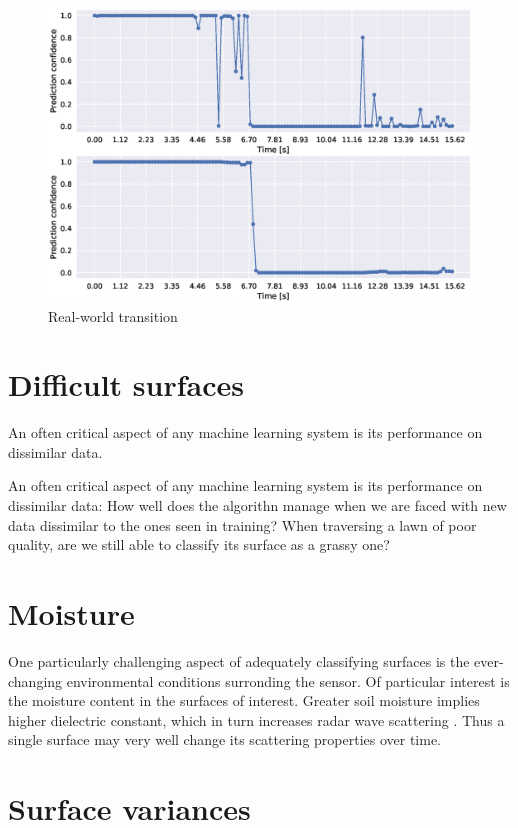 \begin{figure}
	\centering
	\includegraphics[scale=0.5]{figs_temp/transition_grass_gravel2}
	\caption{Real-world transition}
\end{figure}

\section{Difficult surfaces}
An often critical aspect of any machine learning system is its performance on dissimilar data. 

An often critical aspect of any machine learning system is its performance on dissimilar data: How well does the algorithn manage when we are faced with new data dissimilar to the ones seen in training? When traversing a lawn of poor quality, are we still able to classify its surface as a grassy one?  

\section{Moisture}

One particularly challenging aspect of adequately classifying surfaces is the ever-changing environmental conditions surronding the sensor. Of particular interest is the moisture content in the surfaces of interest. Greater soil moisture implies higher dielectric constant, which in turn increases radar wave scattering \citep{rappaport_2006}. Thus a single surface may very well change its scattering properties over time. 


\section{Surface variances}

